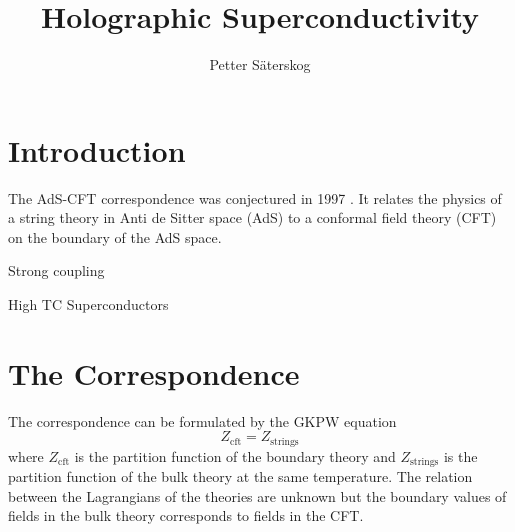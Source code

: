 \documentclass[12pt]{report}
\title{Holographic Superconductivity}
\author{Petter Säterskog}
\begin{document}
\maketitle
\tableofcontents

\section{Introduction}
The AdS-CFT correspondence was conjectured in 1997 \cite{Maldacena:1997re}. It relates the physics of a string theory in Anti de Sitter space (AdS) to a conformal field theory (CFT) on the boundary of the AdS space.

Strong coupling

High TC Superconductors
\section{The Correspondence}
The correspondence can be formulated by the GKPW equation \cite{Witten:1998qj}
\begin{equation}
 Z_{\text{cft}}=Z_{\text{strings}}
\label{GKPW}
\end{equation}
where $Z_{\text{cft}}$ is the partition function of the boundary theory and $Z_{\text{strings}}$ is the partition function of the bulk theory at the same temperature. The relation between the Lagrangians of the theories are unknown but the boundary values of fields in the bulk theory corresponds to fields in the CFT.
\end{document}
